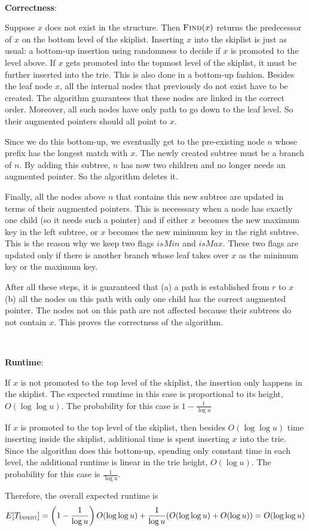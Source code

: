 \documentclass{article}
\begin{document}
~

\noindent\textbf{Correctness}:

Suppose $x$ does not exist in the structure. Then $\textsc{Find}(x)$ returns the predecessor of $x$ on the bottom level of the skiplist. Inserting $x$ into the skiplist is just as usual: a bottom-up insertion using randomness to decide if $x$ is promoted to the level above. If $x$ gets promoted into the topmost level of the skiplist, it must be further inserted into the trie. This is also done in a bottom-up fashion. Besides the leaf node $x$, all the internal nodes that previously do not exist have to be created. The algorithm guarantees that these nodes are linked in the correct order. Moreover, all such nodes have only path to go down to the leaf level. So their augmented pointers should all point to $x$.

Since we do this bottom-up, we eventually get to the pre-existing node $n$ whose prefix has the longest match with $x$. The newly created subtree must be a branch of $n$. By adding this subtree, $n$ has now two children and no longer needs an augmented pointer. So the algorithm deletes it.

Finally, all the nodes above $n$ that contains this new subtree are updated in terms of their augmented pointers. This is necesssary when a node has exactly one child (so it needs such a pointer) and if either $x$ becomes the new maximum key in the left subtree, or $x$ becomes the new minimum key in the right subtree. This is the reason why we keep two flags $isMin$ and $isMax$. These two flags are updated only if there is another branch whose leaf takes over $x$ as the minimum key or the maximum key.

After all these steps, it is guaranteed that (a) a path is established from $r$ to $x$ (b) all the nodes on this path with only one child has the correct augmented pointer. The nodes not on this path are not affected because their subtrees do not contain $x$. This proves the correctness of the algorithm.

~

\noindent\textbf{Runtime}:

If $x$ is not promoted to the top level of the skiplist, the insertion only happens in the skiplist. The expected rumtime in this case is proportional to its height, $O(\log\log u)$. The probability for this case is $1-\frac{1}{\log u}$

If $x$ is promoted to the top level of the skiplist, then besides $O(\log\log u)$ time inserting inside the skiplist, additional time is spent inserting $x$ into the trie. Since the algorithm does this bottom-up, spending only constant time in each level, the additional runtime is linear in the trie height, $O(\log u)$. The probability for this case is $\frac{1}{\log u}$.

Therefore, the overall expected runtime is
\begin{equation*}
E[T_{\textsc{Insert}}]=\left(1-\frac{1}{\log u}\right)O(\log\log u)+\frac{1}{\log u}(O(\log\log u)+O(\log u))=O(\log\log u)
\end{equation*}
\end{document}
